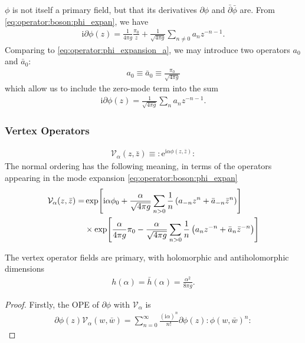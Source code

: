\documentclass[10pt]{article}
\newcommand{\me}{\mathrm{e}}
\newcommand{\ii}{\mathrm{i}}
\begin{document}
$\phi$ is not itself a primary field, but that its derivatives $\partial\phi$ and $\bar{\partial}\bar{\phi}$ are.
From \cref{eq:operator:boson:phi_expan}, we have
\begin{align}
    \ii\partial\phi(z)=\frac{1}{4\pi g}\frac{\pi_0}{z}+\frac{1}{\sqrt{4\pi g}}\sum_{n\neq0}a_n z^{-n-1}.
\end{align}
Comparing to \cref{eq:operator:phi_expansion_a}, we may introduce two operators $a_0$ and $\bar{a}_0$:
\begin{align}
    a_0\equiv\bar{a}_0\equiv\frac{\pi_0}{\sqrt{4\pi g}}
\end{align}
which allow us to include the zero-mode term into the sum
\begin{align}
    \ii\partial\phi(z)=\frac{1}{\sqrt{4\pi g}}\sum_{n}a_n z^{-n-1}.
\end{align}

\subsubsection{Vertex Operators}
\begin{align}
    \mathcal{V}_\alpha(z,\bar{z})\equiv:\me^{\ii\alpha\phi(z,\bar{z})}:
\end{align}
The normal ordering has the following meaning, in terms of the operators appearing in the mode expansion \cref{eq:operator:boson:phi_expan}
\begin{align}
    \mathcal{V}_\alpha(z,\bar{z})= & \exp[\ii\alpha\phi_0+\frac{\alpha}{\sqrt{4\pi g}}\sum_{n>0}\frac{1}{n}\left(a_{-n}z^n+\bar{a}_{-n}\bar{z}^n\right)]\notag              \\
                                   & \times\exp[\frac{\alpha}{4\pi g}\pi_0-\frac{\alpha}{\sqrt{4\pi g}}\sum_{n>0}\frac{1}{n}\left(a_n z^{-n}+\bar{a}_n \bar{z}^{-n}\right)]
\end{align}
\begin{claim}
    The vertex operator fields are primary, with holomorphic and antiholomorphic dimensions
    \begin{align}
        h(\alpha)=\bar{h}(\alpha)=\frac{\alpha^2}{8\pi g}.
    \end{align}
\end{claim}
\begin{proof}
    Firstly, the OPE of $\partial\phi$ with $\mathcal{V}_\alpha$ is
    \begin{align}
        \partial\phi(z)\mathcal{V}_\alpha(w,\bar{w})=\sum_{n=0}^\infty\frac{(\ii\alpha)^n}{n!}\partial\phi(z):\phi(w,\bar{w})^n:
    \end{align}
\end{proof}
\end{document}
